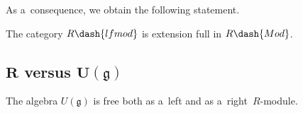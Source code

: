 \documentclass[pdftex]{sigma}
\begin{document}
As a~consequence, we obtain the following statement.

\begin{corollary}
\label{prop26}
The category $R\dash{lfmod}$ is extension full in $R\dash{Mod}$.
\end{corollary}

\subsection[$R$ versus $U(\mathfrak{g})$]{$\boldsymbol{R}$ versus $\boldsymbol{U(\mathfrak{g})}$}%

\begin{proposition}
\label{prop27}
The algebra $U(\mathfrak{g})$ is free both as a~left and as a~right~$R$-module.
\end{proposition}
\end{document}
